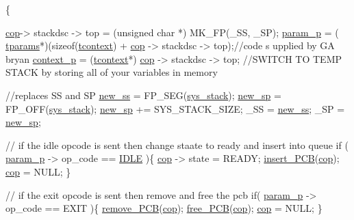 \begin{DoxyCode}
                             \{
        

        \hyperlink{mpx__r3_8c_a199c6145b9b5ee43b3961894ee22830a}{cop}-> stackdsc -> top = (\textcolor{keywordtype}{unsigned} \textcolor{keywordtype}{char} *) MK\_FP(\_SS, \_SP);
        \hyperlink{mpx__r3_8c_aba65384dc26beadd1cf4106e7e60a482}{param_p} = ( \hyperlink{structparams}{tparams}*)(\textcolor{keyword}{sizeof}(\hyperlink{structcontext}{tcontext}) + \hyperlink{mpx__r3_8c_a199c6145b9b5ee43b3961894ee22830a}{cop} -> stackdsc -> top);\textcolor{comment}{//code s
      upplied by GA bryan}
        \hyperlink{mpx__r3_8c_a66a5f6b4272d2caa8085e571fdd61c70}{context_p} = (\hyperlink{structcontext}{tcontext}*) \hyperlink{mpx__r3_8c_a199c6145b9b5ee43b3961894ee22830a}{cop} -> stackdsc -> top;
        \textcolor{comment}{//SWITCH TO TEMP STACK by storing all of your variables in memory}
        
        \textcolor{comment}{//replaces SS and SP}
        \hyperlink{mpx__r3_8c_a15a3c2a819d08f7ea4c3f453ca0f7f9c}{new_ss} = FP\_SEG(\hyperlink{mpx__r3_8c_a5e9ba16a803c3deb38f984cba2e42d5f}{sys_stack});
        \hyperlink{mpx__r3_8c_a1838f728cba427f51c6c45aa89cec007}{new_sp} = FP\_OFF(\hyperlink{mpx__r3_8c_a5e9ba16a803c3deb38f984cba2e42d5f}{sys_stack});
        \hyperlink{mpx__r3_8c_a1838f728cba427f51c6c45aa89cec007}{new_sp} += SYS\_STACK\_SIZE;
        \_SS = \hyperlink{mpx__r3_8c_a15a3c2a819d08f7ea4c3f453ca0f7f9c}{new_ss};
        \_SP = \hyperlink{mpx__r3_8c_a1838f728cba427f51c6c45aa89cec007}{new_sp};
        
        \textcolor{comment}{// if the idle opcode is sent then change staate to ready and insert into
       queue}
        \textcolor{keywordflow}{if} ( \hyperlink{mpx__r3_8c_aba65384dc26beadd1cf4106e7e60a482}{param_p} -> op\_code == \hyperlink{_m_p_x___r5_8h_a9c21a7caee326d7803b94ae1952b27ca}{IDLE} )\{
                        \hyperlink{mpx__r3_8c_a199c6145b9b5ee43b3961894ee22830a}{cop} -> state = READY;
                        \hyperlink{mpx__r2_8c_aa3b334e3a5afd6e590917667ad359a6f}{insert_PCB}(\hyperlink{mpx__r3_8c_a199c6145b9b5ee43b3961894ee22830a}{cop});
                        \hyperlink{mpx__r3_8c_a199c6145b9b5ee43b3961894ee22830a}{cop} = NULL;
        \}
        
        \textcolor{comment}{// if the exit opcode is sent then remove and free the pcb}
        \textcolor{keywordflow}{if}( \hyperlink{mpx__r3_8c_aba65384dc26beadd1cf4106e7e60a482}{param_p} -> op\_code == EXIT )\{
                \hyperlink{mpx__r2_8c_af30a3658210d449b4b53e5be2ed2bc2e}{remove_PCB}(\hyperlink{mpx__r3_8c_a199c6145b9b5ee43b3961894ee22830a}{cop});
                \hyperlink{mpx__r2_8c_a79890f055b1d0fccf1962bbde4877caa}{free_PCB}(\hyperlink{mpx__r3_8c_a199c6145b9b5ee43b3961894ee22830a}{cop});
                \hyperlink{mpx__r3_8c_a199c6145b9b5ee43b3961894ee22830a}{cop} = NULL;
        \}
        

\end{DoxyCode}

